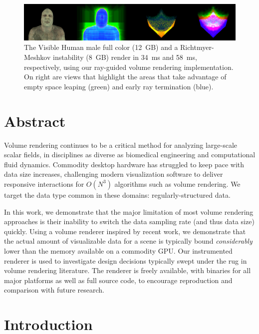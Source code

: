 \begin{figure}
  \includegraphics[draft=\isDraft, width=1.00\linewidth]{images/rg/teaser.png}
  \caption{The Visible Human male full color (\tjftilde{}12~GB) and
  a Richtmyer-Meshkov instability (\tjftilde{}8~GB) render in 34~ms
  and 58~ms, respectively, using our ray-guided volume rendering
  implementation.  On right are views that highlight the areas
  that take advantage of empty space leaping (green) and early ray
  termination (blue).}
  \label{fig:teaser}
\end{figure}

\section{Abstract}
Volume rendering continues to be a critical method for analyzing
large-scale scalar fields, in disciplines as diverse as biomedical
engineering and computational fluid dynamics.
Commodity desktop hardware has struggled to keep pace with data
size increases, challenging modern visualization software to
deliver responsive interactions for $O(N^3)$ algorithms such as
volume rendering.  We target the data type common in these domains:
regularly-structured data.

In this work, we demonstrate that the major limitation of most volume
rendering approaches is their inability to switch the data sampling
rate (and thus data size) quickly.  Using a volume renderer inspired by
recent work, we demonstrate that the actual amount of visualizable data
for a
scene is typically bound \emph{considerably} lower than the memory
available on a commodity GPU.  Our instrumented renderer is used to
investigate design decisions typically swept under the rug in volume
rendering literature.  The renderer is freely available, with binaries
for all major platforms as well as full source code, to encourage
reproduction and comparison with future research.

\section{Introduction}

